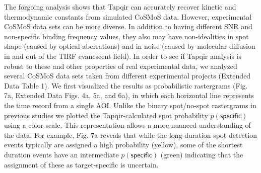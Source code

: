 The forgoing analysis shows that Tapqir can accurately recover kinetic and thermodynamic constants from simulated CoSMoS data.  However, experimental CoSMoS data sets can be more diverse.  In addition to having different SNR and non-specific binding frequency values, they also may have non-idealities in spot shape (caused by optical aberrations) and in noise (caused by molecular diffusion in and out of the TIRF evanescent field).  In order to see if Tapqir analysis is robust to these and other properties of real experimental data, we analyzed several CoSMoS data sets taken from different experimental projects (Extended Data Table 1). We first visualized the results as probabilistic rastergrams (Fig. 7a, Extended Data Figs. 4a, 5a, and 6a), in which each horizontal line represents the time record from a single AOI.  Unlike the binary spot/no-spot rastergrams in previous studies \cite{Friedman2013-sf,Rosen2020-zn} we plotted the Tapqir-calculated spot probability $p(\mathsf{specific})$ using a color scale.  This representation allows a more nuanced understanding of the data.  For example, Fig. 7a reveals that while the long-duration spot detection events typically are assigned a high probability (yellow), some of the shortest duration events have an intermediate $p(\mathsf{specific})$ (green) indicating that the assignment of these as target-specific is uncertain.  

